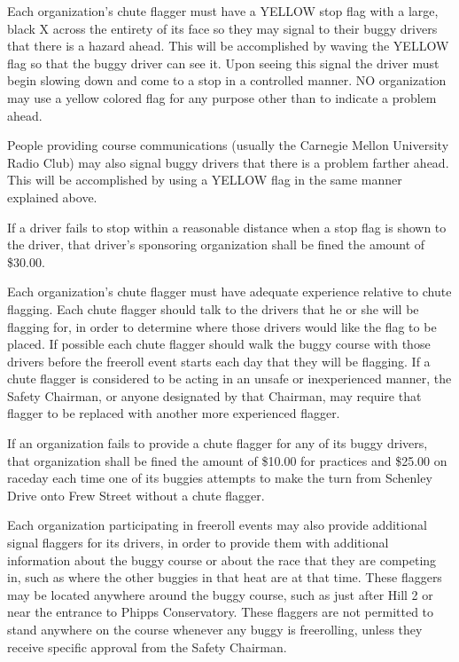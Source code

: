 	Each organization's chute flagger must have a YELLOW stop flag with a large,
	black X across the entirety of its face so they may signal to their buggy drivers 
	that there is a hazard ahead. This will be accomplished by waving the YELLOW flag so 
	that the buggy driver can see it. Upon seeing this signal the driver must begin 
	slowing down and come to a stop in a controlled manner. NO organization may use a 
	yellow colored flag for any purpose other than to indicate a problem ahead.

	People providing course communications (usually the Carnegie Mellon
	University Radio Club) may also signal buggy drivers that there is a problem
	farther ahead. This will be accomplished by using a YELLOW flag in the same
	manner explained above.

        If a driver fails to stop within a reasonable distance when a stop flag is shown to the
        driver, that driver's sponsoring organization shall be fined the amount of \$30.00.

	Each organization's chute flagger must have adequate experience relative to
	chute flagging. Each chute flagger should talk to the drivers that he or she
	will be flagging for, in order to determine where those drivers would like the
	flag to be placed. If possible each chute flagger should walk the buggy course
	with those drivers before the freeroll event starts each day that
	they will be flagging. If a chute flagger is considered to be acting in an
	unsafe or inexperienced manner, the Safety Chairman, or anyone designated by
	that Chairman, may require that flagger to be replaced with another more
	experienced flagger.

	If an organization fails to provide a chute flagger for any of its buggy
	drivers, that organization shall be fined the amount of \$10.00 for practices
	and \$25.00 on raceday each time one
	of its buggies attempts to make the turn from Schenley Drive onto Frew Street
	without a chute flagger.

	Each organization participating in freeroll events may also provide
	additional signal flaggers for its drivers, in order to provide them with
	additional information about the buggy course or about the race that they are
	competing in, such as where the other buggies in that heat are at that time.
	These flaggers may be located anywhere around the buggy course, such as just
	after Hill 2 or near the entrance to Phipps Conservatory. These flaggers are
	not permitted to stand anywhere on the course whenever any buggy is 
	freerolling, unless they receive specific approval from the Safety Chairman.
	
